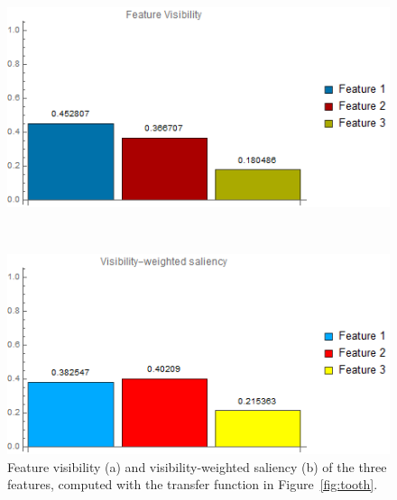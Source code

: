 \begin{figure}
	\centering
	\begin{minipage}{.45\textwidth}
		\includegraphics[width=1\linewidth]{images/tooth_naive_visibility_chart}
		\subcaption{}
	\end{minipage}~
	\begin{minipage}{.45\textwidth}
		\includegraphics[width=1\linewidth]{images/tooth_naive_visibility_saliency_weighted_chart}
		\subcaption{}
	\end{minipage}
	\caption[Feature visibility and visibility-weighted saliency of the three features]{Feature visibility \cite{wang_efficient_2011} (a) and visibility-weighted saliency (b) of the three features, computed with the transfer function in Figure~\ref{fig:tooth}.}
	\label{fig:tooth_saliency_chart}
\end{figure}

